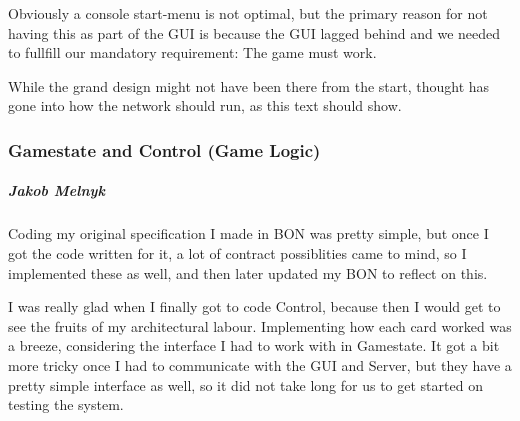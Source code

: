 Obviously a console start-menu is not optimal, but the primary reason for not having this as part of the GUI is because the GUI lagged behind and we needed to fullfill our mandatory requirement: The game must work.

While the grand design might not have been there from the start, thought has gone into how the network should run, as this text should show.

\subsubsection{Gamestate and Control (Game Logic)}
\subparagraph{Jakob Melnyk}
Coding my original specification I made in BON was pretty simple, but once I got the code written for it, a lot of contract possiblities came to mind, so I implemented these as well, and then later updated my BON to reflect on this.

I was really glad when I finally got to code Control, because then I would get to see the fruits of my architectural labour. Implementing how each card worked was a breeze, considering the interface I had to work with in Gamestate. It got a bit more tricky once I had to communicate with the GUI and Server, but they have a pretty simple interface as well, so it did not take long for us to get started on testing the system.